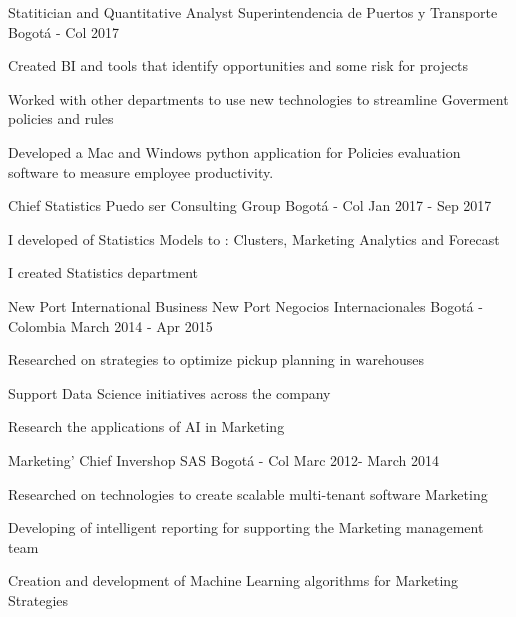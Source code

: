 \begin{cventries}

    \cventry
    {Statitician and Quantitative Analyst}%
    {Superintendencia de Puertos y Transporte} %
    {Bogotá - Col} %
    {2017} %
    {
    \begin{cvitems} 
     \item {Created BI and tools that identify opportunities and some risk for projects}
      \item {Worked with other departments to use new technologies to streamline Goverment policies and rules}
       \item {Developed a Mac and Windows python application for Policies evaluation  software to measure employee productivity.}
       \end{cvitems}
    }


    \cventry
    {Chief Statistics}%
    {Puedo ser Consulting Group} %
    {Bogotá - Col} %
    {Jan 2017 - Sep 2017} %
    {
    \begin{cvitems} 
     \item {I developed of Statistics Models to : Clusters, Marketing Analytics and Forecast}
      \item {I created Statistics department }
       \end{cvitems}
    }
    

    \cventry
    {New Port International Business }%
    {New Port Negocios Internacionales} %
    {Bogotá - Colombia} %
    {March 2014 - Apr 2015} %
    {
    \begin{cvitems} 
     \item {Researched on strategies to optimize pickup planning in warehouses}
      \item {Support Data Science initiatives across the company}
       \item {Research the applications of AI in Marketing}
       \end{cvitems}
    }
    

    \cventry
    {Marketing' Chief}%
    {Invershop SAS} %
    {Bogotá - Col} %
    {Marc 2012- March 2014} %
    {
    \begin{cvitems} 
     \item { Researched on technologies to create scalable multi-tenant
software Marketing}
      \item {Developing of intelligent reporting for supporting the Marketing management team}
       \item {Creation and development of Machine Learning algorithms for Marketing Strategies }
       \end{cvitems}
    }


\end{cventries}

